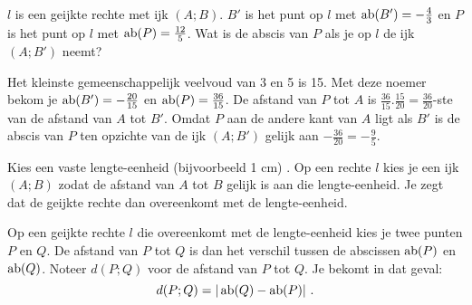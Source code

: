 \begin{voorbeeld}
	
$l$ is een geijkte rechte met ijk $(A;B)$.
$B'$ is het punt op $l$ met $\operatorname{ab} (B')=-\frac{4}{3}$ en $P$ is het punt op $l$ met $\operatorname{ab} (P)=\frac{12}{5}$.
Wat is de abscis van $P$ als je op $l$ de ijk $(A;B')$ neemt?



Het kleinste gemeenschappelijk veelvoud van 3 en 5 is 15.
Met deze noemer bekom je $\operatorname{ab} (B')=-\frac{20}{15}$ en $\operatorname{ab} (P)=\frac{36}{15}$.
De afstand van $P$ tot $A$ is $\frac{36}{15}.\frac{15}{20}=\frac{36}{20}$-ste van de afstand van $A$ tot $B'$.
Omdat $P$ aan de andere kant van $A$ ligt als $B'$ is de abscis van $P$ ten opzichte van de ijk $(A;B')$ gelijk aan $-\frac{36}{20}=-\frac{9}{5}$.

\end{voorbeeld}


Kies een vaste lengte-eenheid (bijvoorbeeld 1 cm) .
Op een rechte $l$ kies je een ijk $(A;B)$ zodat de afstand van $A$ tot $B$ gelijk is aan die lengte-eenheid.
Je zegt dat de geijkte rechte dan overeenkomt met de lengte-eenheid.

Op een geijkte rechte $l$ die overeenkomt met de lengte-eenheid kies je twee punten $P$ en $Q$.
De afstand van $P$ tot $Q$ is dan het verschil tussen de abscissen $\operatorname{ab} (P)$ en $\operatorname{ab} (Q)$.
Noteer $d(P;Q)$ voor de afstand van $P$ tot $Q$.
Je bekomt in dat geval:
\[
d(P;Q)=\vert \operatorname{ab} (Q) - \operatorname{ab} (P) \vert \text { .}
\]

